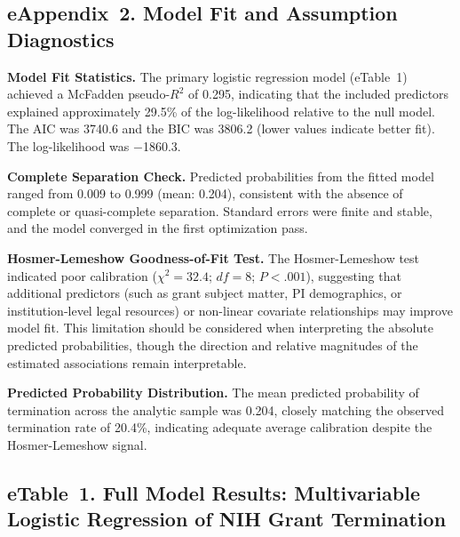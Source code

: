 \documentclass[10pt, letterpaper]{article}
\begin{document}
\subsection*{eAppendix~2. Model Fit and Assumption Diagnostics}

\textbf{Model Fit Statistics.} The primary logistic regression model (eTable~1) achieved a McFadden pseudo-$R^{2}$ of 0.295, indicating that the included predictors explained approximately 29.5\% of the log-likelihood relative to the null model. The AIC was 3740.6 and the BIC was 3806.2 (lower values indicate better fit). The log-likelihood was $-$1860.3.

\textbf{Complete Separation Check.} Predicted probabilities from the fitted model ranged from 0.009 to 0.999 (mean: 0.204), consistent with the absence of complete or quasi-complete separation. Standard errors were finite and stable, and the model converged in the first optimization pass.

\textbf{Hosmer-Lemeshow Goodness-of-Fit Test.} The Hosmer-Lemeshow test indicated poor calibration ($\chi^{2} = 32.4$; $df = 8$; $P < .001$), suggesting that additional predictors (such as grant subject matter, PI demographics, or institution-level legal resources) or non-linear covariate relationships may improve model fit. This limitation should be considered when interpreting the absolute predicted probabilities, though the direction and relative magnitudes of the estimated associations remain interpretable.

\textbf{Predicted Probability Distribution.} The mean predicted probability of termination across the analytic sample was 0.204, closely matching the observed termination rate of 20.4\%, indicating adequate average calibration despite the Hosmer-Lemeshow signal.

\subsection*{eTable~1. Full Model Results: Multivariable Logistic Regression of NIH Grant Termination}
\end{document}
